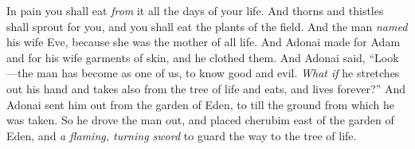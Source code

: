 \begin{biblechapter}
In pain you shall eat \textit{from} it 
all the days of your life.
\verse And thorns and thistles shall sprout for you, 
and you shall eat the plants of the field.
\verse And the man \textit{named} his wife Eve, because she was the mother of all life.
\verse And Adonai made for Adam and for his wife garments of skin, and he clothed them.
\verse And Adonai said, “Look—the man has become as one of us, to know good and evil. \textit{What if} he stretches out his hand and takes also from the tree of life and eats, and lives forever?”
\verse And Adonai sent him out from the garden of Eden, to till the ground from which he was taken.
\verse So he drove the man out, and placed cherubim east of the garden of Eden, and \textit{a flaming, turning sword} to guard the way to the tree of life.
\end{biblechapter}

